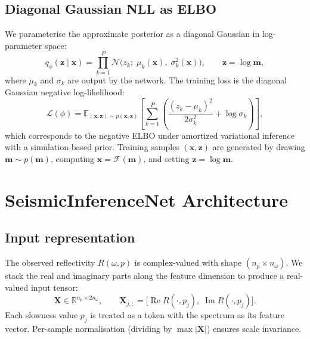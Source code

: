 \documentclass[11pt,a4paper]{article}
\theoremstyle{plain}
\theoremstyle{remark}
\begin{document}
\subsection{Diagonal Gaussian NLL as ELBO}

We parameterise the approximate posterior as a diagonal Gaussian in
log-parameter space:
\begin{equation}\label{eq:approx-posterior}
  q_\phi(\mathbf{z}\mid\mathbf{x})
  = \prod_{k=1}^{P} \mathcal{N}\bigl(z_k;\; \mu_k(\mathbf{x}),\;
    \sigma_k^2(\mathbf{x})\bigr),
  \qquad \mathbf{z} = \log\mathbf{m},
\end{equation}
where $\mu_k$ and $\sigma_k$ are output by the network.  The training
loss is the diagonal Gaussian negative log-likelihood:
\begin{equation}\label{eq:nll-loss}
  \mathcal{L}(\phi)
  = \mathbb{E}_{(\mathbf{x},\mathbf{z})\sim p(\mathbf{x},\mathbf{z})}
    \left[
      \sum_{k=1}^{P}
      \left(
        \frac{(z_k - \mu_k)^2}{2\sigma_k^2} + \log\sigma_k
      \right)
    \right],
\end{equation}
which corresponds to the negative ELBO under amortized variational
inference with a simulation-based prior.  Training samples
$(\mathbf{x}, \mathbf{z})$ are generated by drawing
$\mathbf{m} \sim p(\mathbf{m})$, computing
$\mathbf{x} = \mathcal{F}(\mathbf{m})$, and setting
$\mathbf{z} = \log\mathbf{m}$.

\section{SeismicInferenceNet Architecture}\label{sec:architecture}

\subsection{Input representation}

The observed reflectivity $R(\omega, p)$ is complex-valued with shape
$(n_p \times n_\omega)$.  We stack the real and imaginary parts along
the feature dimension to produce a real-valued input tensor:
\begin{equation}\label{eq:input}
  \mathbf{X} \in \mathbb{R}^{n_p \times 2n_\omega},
  \qquad
  \mathbf{X}_{j,:} = \bigl[\operatorname{Re} R(\cdot, p_j),\;
                            \operatorname{Im} R(\cdot, p_j)\bigr].
\end{equation}
Each slowness value $p_j$ is treated as a token with the spectrum as
its feature vector.  Per-sample normalisation (dividing by
$\max|\mathbf{X}|$) ensures scale invariance.
\end{document}
